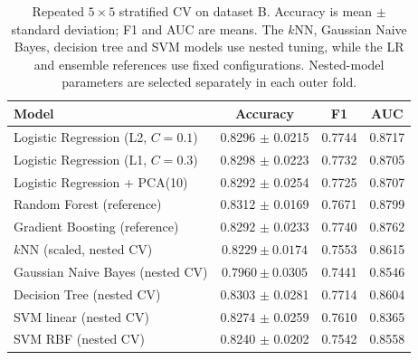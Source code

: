 \begin{table}[t]
\centering\small
\caption{Repeated $5\times5$ stratified CV on dataset B. Accuracy is mean $\pm$ standard deviation; F1 and AUC are means. The $k$NN, Gaussian Naive Bayes, decision tree and SVM models use nested tuning, while the LR and ensemble references use fixed configurations. Nested-model parameters are selected separately in each outer fold.}
\label{tab:models}
\begin{tabular}{lccc}
\toprule
Model & Accuracy & F1 & AUC \\
\midrule
Logistic Regression (L2, $C{=}0.1$) & 0.8296 $\pm$ 0.0215 & 0.7744 & 0.8717 \\
Logistic Regression (L1, $C{=}0.3$) & 0.8298 $\pm$ 0.0223 & 0.7732 & 0.8705 \\
Logistic Regression + PCA(10) & 0.8292 $\pm$ 0.0254 & 0.7725 & 0.8707 \\
Random Forest (reference) & 0.8312 $\pm$ 0.0169 & 0.7671 & 0.8799 \\
Gradient Boosting (reference) & 0.8292 $\pm$ 0.0233 & 0.7740 & 0.8762 \\
\midrule
$k$NN (scaled, nested CV) & $0.8229\pm0.0174$ & 0.7553 & 0.8615 \\
Gaussian Naive Bayes (nested CV) & $0.7960\pm0.0305$ & 0.7441 & 0.8546 \\
Decision Tree (nested CV) & 0.8303 $\pm$ 0.0281 & 0.7714 & 0.8604 \\
SVM linear (nested CV) & 0.8274 $\pm$ 0.0259 & 0.7610 & 0.8365 \\
SVM RBF (nested CV) & 0.8240 $\pm$ 0.0202 & 0.7542 & 0.8558 \\
\bottomrule
\end{tabular}
\end{table}
